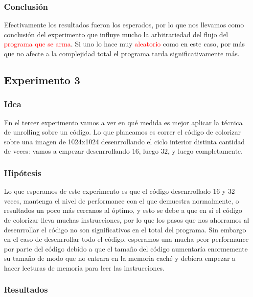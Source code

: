 \medskip

\subsubsection{Conclusión}
\par{Efectivamente los resultados fueron los esperados, por lo que nos llevamos como conclusión del experimento que influye mucho la arbitrariedad del flujo del \textcolor{red}{programa que se arma}. Si uno lo hace muy \textcolor{red}{aleatorio} como en este caso, por más que no afecte a la complejidad total el programa tarda significativamente más.}

\subsection{Experimento 3}

\subsubsection{Idea}
\par{En el tercer experimento vamos a ver en qué medida es mejor aplicar la técnica de unrolling sobre un código. Lo que planeamos es correr el código de colorizar sobre una imagen de 1024x1024 desenrrollando el ciclo interior distinta cantidad de veces: vamos a empezar desenrrollando 16, luego 32, y luego completamente.}

	   
\subsubsection{Hipótesis}
\par{Lo que esperamos de este experimento es que el código desenrrollado 16 y 32 veces, mantenga el nivel de performance con el que demuestra normalmente, o resultados un poco más cercanos al óptimo, y esto se debe a que en sí el código de colorizar lleva muchas instrucciones, por lo que los pasos que nos ahorramos al desenrrollar el código no son significativos en el total del programa. Sin embargo en el caso de desenrrollar todo el código, esperamos una mucha peor performance por parte del código debido a que el tamaño del código aumentaría enormemente su tamaño de modo que no entrara en la memoria caché y debiera empezar a hacer lecturas de memoria para leer las instrucciones.}
	
\subsubsection{Resultados}

